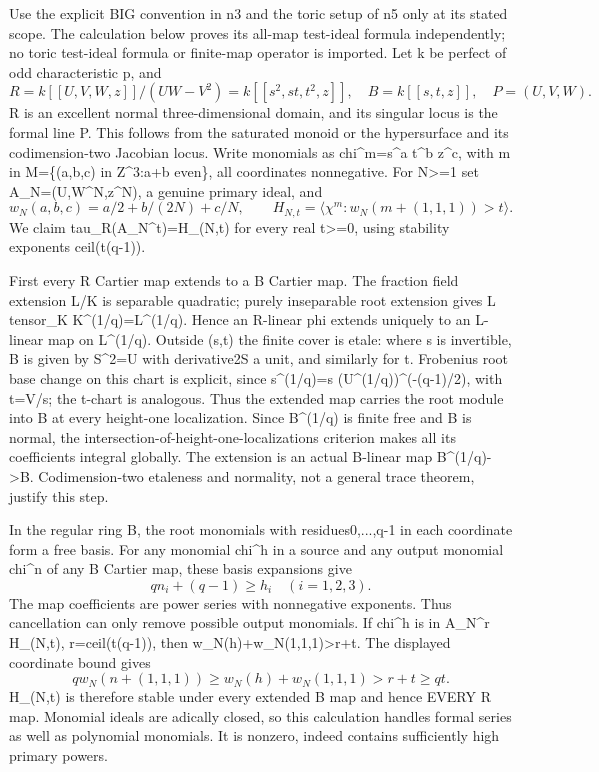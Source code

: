 \documentclass[11pt]{article}
\begin{document}
Use the explicit BIG convention in n3 and the toric setup of n5 only at its stated scope. The calculation below proves its all-map test-ideal formula independently; no toric test-ideal formula or finite-map operator is imported. Let k be perfect of odd characteristic p, and
\[
R=k[[U,V,W,z]]/(UW-V^2)=k[[s^2,st,t^2,z]],
\quad B=k[[s,t,z]],\quad P=(U,V,W).
\]
R is an excellent normal three-dimensional domain, and its singular locus is the formal line P. This follows from the saturated monoid or the hypersurface and its codimension-two Jacobian locus. Write monomials as chi\textasciicircum{}m=s\textasciicircum{}a t\textasciicircum{}b z\textasciicircum{}c, with m in M=\{(a,b,c) in Z\textasciicircum{}3:a+b even\}, all coordinates nonnegative. For N>=1 set A\_N=(U,W\textasciicircum{}N,z\textasciicircum{}N), a genuine primary ideal, and
\[
w_N(a,b,c)=a/2+b/(2N)+c/N,\qquad
H_{N,t}=\langle\chi^m:w_N(m+(1,1,1))>t\rangle.
\]
We claim tau\_R(A\_N\textasciicircum{}t)=H\_(N,t) for every real t>=0, using stability exponents ceil(t(q-1)).

First every R Cartier map extends to a B Cartier map. The fraction field extension L/K is separable quadratic; purely inseparable root extension gives L tensor\_K K\textasciicircum{}(1/q)=L\textasciicircum{}(1/q). Hence an R-linear phi extends uniquely to an L-linear map on L\textasciicircum{}(1/q). Outside (s,t) the finite cover is etale: where s is invertible, B is given by S\textasciicircum{}2=U with derivative2S a unit, and similarly for t. Frobenius root base change on this chart is explicit, since s\textasciicircum{}(1/q)=s (U\textasciicircum{}(1/q))\textasciicircum{}(-(q-1)/2), with t=V/s; the t-chart is analogous. Thus the extended map carries the root module into B at every height-one localization. Since B\textasciicircum{}(1/q) is finite free and B is normal, the intersection-of-height-one-localizations criterion makes all its coefficients integral globally. The extension is an actual B-linear map B\textasciicircum{}(1/q)->B. Codimension-two etaleness and normality, not a general trace theorem, justify this step.

In the regular ring B, the root monomials with residues0,...,q-1 in each coordinate form a free basis. For any monomial chi\textasciicircum{}h in a source and any output monomial chi\textasciicircum{}n of any B Cartier map, these basis expansions give
\[
q n_i+(q-1)\ge h_i\quad(i=1,2,3).
\]
The map coefficients are power series with nonnegative exponents. Thus cancellation can only remove possible output monomials. If chi\textasciicircum{}h is in A\_N\textasciicircum{}r H\_(N,t), r=ceil(t(q-1)), then w\_N(h)+w\_N(1,1,1)>r+t. The displayed coordinate bound gives
\[
q w_N(n+(1,1,1))\ge w_N(h)+w_N(1,1,1)>r+t\ge qt.
\]
H\_(N,t) is therefore stable under every extended B map and hence EVERY R map. Monomial ideals are adically closed, so this calculation handles formal series as well as polynomial monomials. It is nonzero, indeed contains sufficiently high primary powers.
\end{document}
